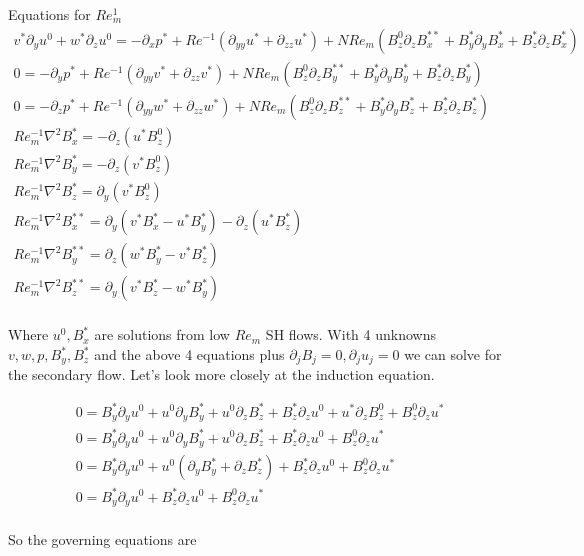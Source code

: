 \documentclass[11pt]{article}
\newcommand{\PD}{\partial}
\begin{document}
Equations for $Re_m^1$
\begin{equation}\begin{aligned}
v^* \PD_y u^0 + w^* \PD_z u^0 = -\PD_x p^*+ Re^{-1} (\PD_{yy} u^* + \PD_{zz} u^*) + N Re_m (B_z^0 \PD_z B_x^{**} + B_y^* \PD_y B_x^* + B_z^* \PD_z B_x^* ) \\
0                             = -\PD_y p^*+ Re^{-1} (\PD_{yy} v^* + \PD_{zz} v^*) + N Re_m (B_z^0 \PD_z B_y^{**} + B_y^* \PD_y B_y^* + B_z^* \PD_z B_y^* ) \\
0                             = -\PD_z p^*+ Re^{-1} (\PD_{yy} w^* + \PD_{zz} w^*) + N Re_m (B_z^0 \PD_z B_z^{**} + B_y^* \PD_y B_z^* + B_z^* \PD_z B_z^* ) \\
Re_m^{-1} \nabla^2 B_x^{*}  =-\PD_z (u^* B_z^{0}) \\
Re_m^{-1} \nabla^2 B_y^{*}  =-\PD_z (v^* B_z^{0}) \\
Re_m^{-1} \nabla^2 B_z^{*}  = \PD_y (v^* B_z^{0}) \\
Re_m^{-1} \nabla^2 B_x^{**} = \PD_y (v^* B_x^{*} - u^* B_y^{*}) - \PD_z (u^* B_z^{*}) \\
Re_m^{-1} \nabla^2 B_y^{**} = \PD_z (w^* B_y^{*} - v^* B_z^{*}) \\
Re_m^{-1} \nabla^2 B_z^{**} = \PD_y (v^* B_z^{*} - w^* B_y^{*}) \\
\end{aligned}\end{equation}

Where $u^0, B_x^*$ are solutions from low $Re_m$ SH flows. With 4 unknowns $v,w,p,B_y^*,B_z^*$ and the above 4 equations
plus $\PD_j B_j = 0, \PD_j u_j = 0$ we can solve for the secondary flow. Let's look more closely at the induction equation.

\begin{equation}\begin{aligned}
0 =  B_y^{*} \PD_y u^0 + u^0 \PD_y B_y^{*} + u^0 \PD_z B_z^{*} + B_z^{*} \PD_z u^0 + u^* \PD_z B_z^0 + B_z^0 \PD_z u^* \\
0 =  B_y^{*} \PD_y u^0 + u^0 \PD_y B_y^{*} + u^0 \PD_z B_z^{*} + B_z^{*} \PD_z u^0 + B_z^0 \PD_z u^* \\
0 =  B_y^{*} \PD_y u^0 + u^0 (\PD_y B_y^{*} + \PD_z B_z^{*}) + B_z^{*} \PD_z u^0 + B_z^0 \PD_z u^* \\
0 =  B_y^{*} \PD_y u^0 + B_z^{*} \PD_z u^0 + B_z^0 \PD_z u^* \\
\end{aligned}\end{equation}

So the governing equations are
\end{document}
